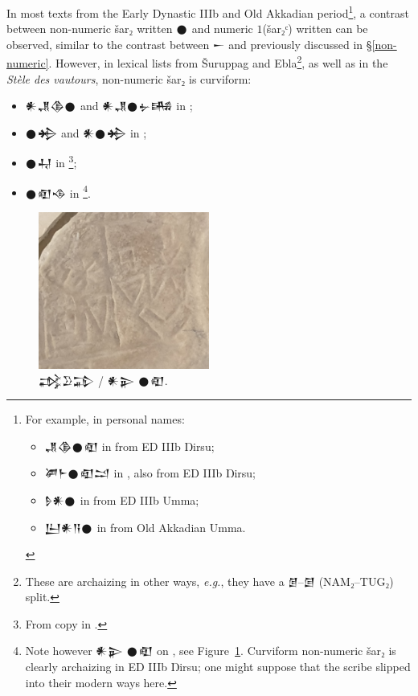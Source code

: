 \documentclass[10pt, a4paper, twoside]{article}
\newcommand\oneAšC{{\proposalfont\symbol{"12550}}} %
\newcommand\oneŊešTwoC{{\proposalfont\symbol{"1256B}}}
\newcommand\oneŊešʾuC{{\proposalfont\symbol{"12574}}}
\newcommand\oneŠarTwoC{{\proposalfont\symbol{"12579}}}
\newcommand\oneŠarʾuC{{\proposalfont\symbol{"12582}}}
\newcommand{\exempligratia}{\emph{e.g.}}
\newcommand{\obverse}{obv.}
\newcommand{\reverse}{rev.}
\newcommand{\recto}{\emph{recto}}
\begin{document}
In most texts from the Early Dynastic IIIb and Old Akkadian period\footnote{For example, in personal names:\begin{itemize}[nosep]
\item {\xsuxfont 𒂗𒆠𒊹𒊏} in \cite[\reverse~1~2]{P020019} from ED IIIb Ŋirsu;
\item {\xsuxfont 𒂄𒈨𒊹𒊏𒁺} in \cite[\obverse~2~9]{P020182}, also from ED IIIb Ŋirsu; 
\item {\xsuxfont 𒊩𒀭𒊹} in \cite[\obverse~3~3]{P222186} from ED IIIb Umma;
\item {\xsuxfont 𒌨𒀭𒀀𒊹} in \cite[\obverse~16]{P235312} from Old Akkadian Umma.
\end{itemize}},
a contrast between non-numeric šar₂ written {\xsuxfont 𒊹}
and numeric $1$(šar₂ᶜ) written \oneŠarTwoC{} can be observed,
similar to the contrast between {\xsuxfont 𒀸} and {\oneAšC}
previously discussed in §\ref{non-numeric}.
However, in lexical lists from Šuruppag and Ebla\footnote{These are
archaizing in other ways, \exempligratia, they have a
{\xsuxfont 𒉇}--{\xsuxfont 𒌆} (NAM₂--TUG₂) split.},
as well as in the \emph{\textfrench{Stèle des vautours}},
non-numeric šar₂ is curviform:\begin{itemize}[nosep]
  \item {\originalNoto 𒀭𒂗𒆠𒊹} and {\originalNoto 𒀭𒂗𒊹𒉡𒄄} in \cite[\obverse~10~10; 11]{P010566};
  \item {\originalNoto 𒊹𒄈} and {\originalNoto 𒀭𒊹𒄈} in \cite[\reverse~3~16; 17]{P010576};
  \item {\originalNoto 𒊹𒄷} in \cite[\href{https://oracc.museum.upenn.edu/dcclt/P240986.44}{\recto~3~3}]{P240986}\footnote{From copy in \cite[Elles~397]{ELLes}.};
  \item {\originalNoto 𒊹𒊏𒈾} in \cite[\obverse~17~9; 18 11; 22 12]{P222399}\footnote{Note
  however {\xsuxfont 𒀭𒉌 𒊹𒊏} on \cite[\obverse~6~17]{P222399}, see 
  Figure~\ref{vultureSquare}.
  Curviform non-numeric šar₂ is clearly archaizing in ED IIIb Ŋirsu;
  one might suppose that the scribe slipped into their modern ways here.}.
\end{itemize}
\begin{figure}
  \begin{center}
    \includegraphics[width=0.5\textwidth]{vautours.png}
    \caption{\cite[\obverse~6~16--17]{P222399} {\xsuxfont 𒃶𒊒𒁉} / {\xsuxfont 𒀭𒉌 𒊹𒊏}.\label{vultureSquare}}      
  \end{center}
\end{figure}
\end{document}
